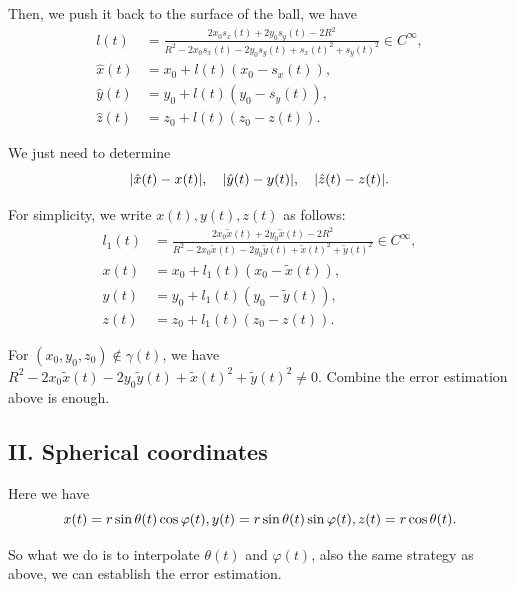 \documentclass[a4paper]{article}
\begin{document}
Then, we push it back to the surface of the ball, we have
\begin{equation}
    \begin{aligned}
        l(t) &= \frac{2x_0 s_x(t)+2y_0 s_y(t) - 2 R^2}{R^2 - 2x_0 s_x(t) - 2y_0 s_y(t) + s_x(t)^2 + s_y(t)^2} \in C^{\infty}, \\
        \hat{x}(t) &= x_0 + l(t) (x_0 - s_x(t)), \\
        \hat{y}(t) &= y_0 + l(t) (y_0 - s_y(t)), \\
        \hat{z}(t) &= z_0 + l(t) (z_0 - z(t)).
    \end{aligned}
\end{equation}

We just need to determine 
\begin{equation}
    \abs{\hat{x}(t) - x(t)}, \quad \abs{\hat{y}(t) - y(t)}, \quad \abs{\hat{z}(t) - z(t)}.
\end{equation}

For simplicity, we write $x(t), y(t), z(t)$ as follows:
\begin{equation}
    \begin{aligned}
        l_1(t) &= \frac{2x_0 \tilde{x}(t)+2y_0 \tilde{x}(t) - 2 R^2}{R^2 - 2x_0 \tilde{x}(t) - 2y_0 \tilde{y}(t) + \tilde{x}(t)^2 + \tilde{y}(t)^2} \in C^{\infty}, \\
        x(t) &= x_0 + l_1(t) (x_0 - \tilde{x}(t)), \\
        y(t) &= y_0 + l_1(t) (y_0 - \tilde{y}(t)), \\
        z(t) &= z_0 + l_1(t) (z_0 - z(t)).
    \end{aligned}
\end{equation}

For $(x_0, y_0, z_0) \notin \gamma (t)$, we have $R^2 - 2x_0 \tilde{x}(t) - 2y_0 \tilde{y}(t) + \tilde{x}(t)^2 + \tilde{y}(t)^2 \ne 0$. 
Combine the error estimation above is enough. 


\subsection{II. Spherical coordinates}

Here we have 
\begin{equation}
    x(t) = r \sin \theta(t) \cos \varphi(t), \\
    y(t) = r \sin \theta(t) \sin \varphi(t), \\
    z(t) = r \cos \theta(t).
\end{equation}

So what we do is to interpolate $\theta(t)$ and $\varphi(t)$, also the same strategy as above, we can establish the error estimation.
\end{document}
